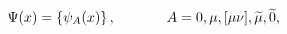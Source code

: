 \begin{equation}
\Psi (x)=\left\{ \psi _A (x)\right\} ,\hspace{0.5in}A=0,\mu ,[\mu
\nu ], \widetilde{\mu },\widetilde{0} , \label{15}
\end{equation}

